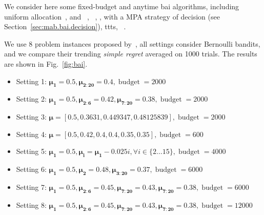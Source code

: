 We consider here some fixed-budget and anytime \gls{bai} algorithms, including uniform allocation~\citep{bubeck2009pure}, \UCBE{} and \SR{}~\citep{audibert2010budget}, \UGapE~\citep{gabillon2012ugape}, \SHA{}, \TS{} with a MPA strategy of decision (see Section~\ref{sec:mab.bai.decision}), \gls{ttts}{}, \ATLUCB{}~\citep{jun2016atlucb}.

We use 8 problem instances proposed by~\cite{audibert2010budget}, all settings consider Bernoulli bandits, and we compare their trending \emph{simple regret} averaged on 1000 trials. The results are shown in Fig.~\ref{fig:bai}.

\begin{itemize}
	\item Setting 1: $\mathbf{\mu_1}=0.5, \mathbf{\mu_{2:20}}=0.4, \operatorname{budget}=2000$
	\item Setting 2: $\mathbf{\mu_1}=0.5, \mathbf{\mu_{2:6}}=0.42, \mathbf{\mu_{7:20}}=0.38, \operatorname{budget}=2000$
	\item Setting 3: $\mathbf{\mu}=[0.5, 0.3631, 0.449347, 0.48125839], \operatorname{budget}=2000$
	\item Setting 4: $\mathbf{\mu}=[0.5, 0.42, 0.4, 0.4, 0.35, 0.35], \operatorname{budget}=600$
	\item Setting 5: $\mathbf{\mu_1}=0.5, \mathbf{\mu_i}=\mathbf{\mu_1}-0.025i, \forall i\in\{2\ldots15\}, \operatorname{budget}=4000$
	\item Setting 6: $\mathbf{\mu_1}=0.5, \mathbf{\mu_2}=0.48, \mathbf{\mu_{3:20}}=0.37, \operatorname{budget}=6000$
	\item Setting 7: $\mathbf{\mu_1}=0.5, \mathbf{\mu_{2:6}}=0.45, \mathbf{\mu_{7:20}}=0.43, \mathbf{\mu_{7:20}}=0.38, \operatorname{budget}=6000$
	\item Setting 8: $\mathbf{\mu_1}=0.5, \mathbf{\mu_{2:6}}=0.45, \mathbf{\mu_{7:20}}=0.43, \mathbf{\mu_{7:20}}=0.38, \operatorname{budget}=12000$
\end{itemize}

